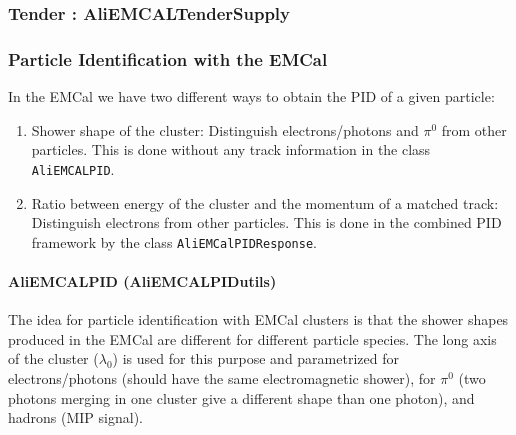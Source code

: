\subsubsection{Tender : AliEMCALTenderSupply}

\subsubsection{Particle Identification with the EMCal}

In the EMCal we have two different ways to obtain the PID of a given particle:
\begin{enumerate}
\item Shower shape of the cluster: Distinguish electrons/photons and $\pi^{0}$ from other particles. This is done without any track information in the class \texttt{AliEMCALPID}.
\item Ratio between energy of the cluster and the momentum of a matched track: Distinguish electrons from other particles. This is done in the combined PID framework by the class \texttt{AliEMCalPIDResponse}.
\end{enumerate}

\paragraph{AliEMCALPID (AliEMCALPIDutils)}

The idea for particle identification with EMCal clusters is that the shower shapes produced in the EMCal are different for different particle species. The long axis of the cluster ($\lambda_{0}$) is used for this purpose and parametrized for electrons/photons (should have the same electromagnetic shower), for $\pi^{0}$ (two photons merging in one cluster give a different shape than one photon), and hadrons (MIP signal).

